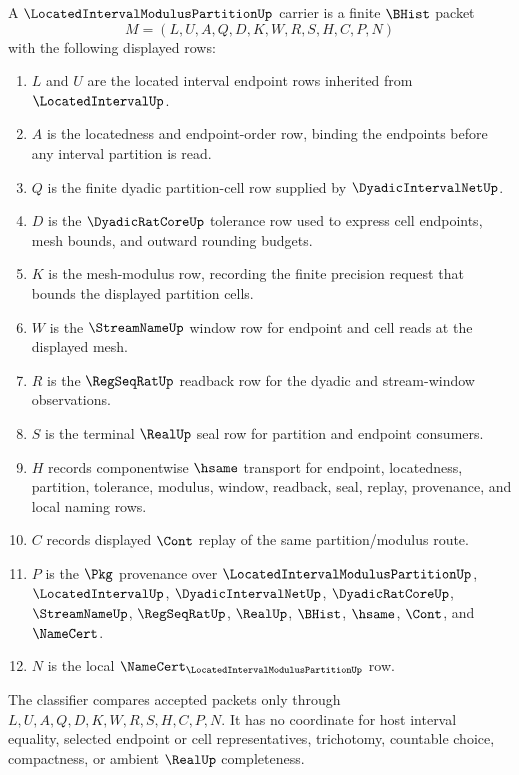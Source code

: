 \begin{definition}
\label{def:located-interval-modulus-partition-carrier}
A $\LocatedIntervalModulusPartitionUp$ carrier is a finite $\BHist$ packet
$$
M=(L,U,A,Q,D,K,W,R,S,H,C,P,N)
$$
with the following displayed rows:
\begin{enumerate}
\item $L$ and $U$ are the located interval endpoint rows inherited from $\LocatedIntervalUp$.
\item $A$ is the locatedness and endpoint-order row, binding the endpoints before any interval partition is read.
\item $Q$ is the finite dyadic partition-cell row supplied by $\DyadicIntervalNetUp$.
\item $D$ is the $\DyadicRatCoreUp$ tolerance row used to express cell endpoints, mesh bounds, and outward rounding budgets.
\item $K$ is the mesh-modulus row, recording the finite precision request that bounds the displayed partition cells.
\item $W$ is the $\StreamNameUp$ window row for endpoint and cell reads at the displayed mesh.
\item $R$ is the $\RegSeqRatUp$ readback row for the dyadic and stream-window observations.
\item $S$ is the terminal $\RealUp$ seal row for partition and endpoint consumers.
\item $H$ records componentwise $\hsame$ transport for endpoint, locatedness, partition, tolerance, modulus, window, readback, seal, replay, provenance, and local naming rows.
\item $C$ records displayed $\Cont$ replay of the same partition/modulus route.
\item $P$ is the $\Pkg$ provenance over $\LocatedIntervalModulusPartitionUp$, $\LocatedIntervalUp$, $\DyadicIntervalNetUp$, $\DyadicRatCoreUp$, $\StreamNameUp$, $\RegSeqRatUp$, $\RealUp$, $\BHist$, $\hsame$, $\Cont$, and $\NameCert$.
\item $N$ is the local $\NameCert_{\LocatedIntervalModulusPartitionUp}$ row.
\end{enumerate}
The classifier compares accepted packets only through $L,U,A,Q,D,K,W,R,S,H,C,P,N$. It has no coordinate for host interval equality, selected endpoint or cell representatives, trichotomy, countable choice, compactness, or ambient $\RealUp$ completeness.
\end{definition}

